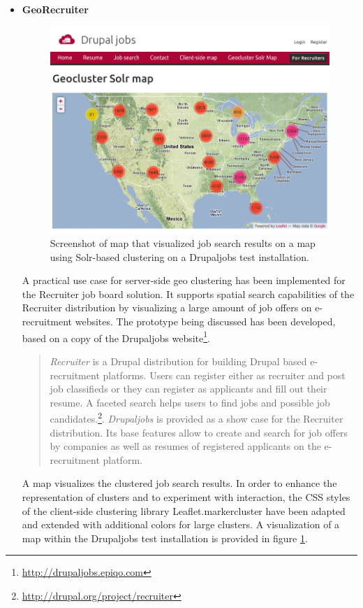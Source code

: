 \begin{itemize}
\item \textbf{GeoRecruiter}

\begin{figure}[h]
  \begin{center}
    \includegraphics[width=1\textwidth]{figures/drupaljobs_geocluster_solr.png}
    \caption{Screenshot of map that visualized job search results on a map using Solr-based clustering on a Drupaljobs test installation.}
    \label{fig:drupaljobs-geocluster-solr}
  \end{center}
\end{figure}

A practical use case for server-side geo clustering has been implemented for the Recruiter job board solution. It supports spatial search capabilities of the Recruiter distribution by visualizing a large amount of job offers on e-recruitment websites. The prototype being discussed has been developed, based on a copy of the Drupaljobs website\footnote{\url{http://drupaljobs.epiqo.com}}.

\begin{quote}
\textit{Recruiter} is a Drupal distribution for building Drupal based e-recruitment platforms. Users can register either as recruiter and post job classifieds or they can register as applicants and fill out their resume. A faceted search helps users to find jobs and possible job candidates.\footnote{\url{http://drupal.org/project/recruiter}}. \textit{Drupaljobs} is provided as a show case for the Recruiter distribution. Its base features allow to create and search for job offers by companies as well as resumes of registered applicants on the e-recruitment platform.
\end{quote}


A map visualizes the clustered job search results. In order to enhance the representation of clusters and to experiment with interaction, the CSS styles of the client-side clustering library Leaflet.markercluster have been adapted and extended with additional colors for large clusters. A visualization of a map within the Drupaljobs test installation is provided in figure \ref{fig:drupaljobs-geocluster-solr}.




\end{itemize}

